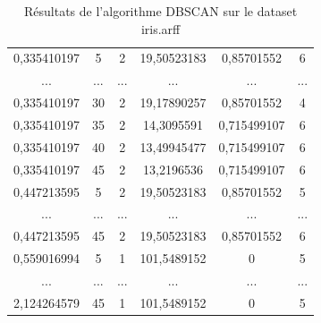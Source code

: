 \begin{table}[H]
\begin{tabular}{|c|c|c|c|c|c|}
				0,335410197         & 5               & 2                   & 19,50523183                      & 0,85701552                       & 6              \\
				...                 & ...             & ...                 & ...                              & ...                              & ...            \\
				0,335410197         & 30              & 2                   & 19,17890257                      & 0,85701552                       & 4              \\
				0,335410197         & 35              & 2                   & 14,3095591                       & 0,715499107                      & 6              \\
				0,335410197         & 40              & 2                   & 13,49945477                      & 0,715499107                      & 6              \\
				0,335410197         & 45              & 2                   & 13,2196536                       & 0,715499107                      & 6              \\
				0,447213595         & 5               & 2                   & 19,50523183                      & 0,85701552                       & 5              \\
				...                 & ...             & ...                 & ...                              & ...                              & ...            \\
				0,447213595         & 45              & 2                   & 19,50523183                      & 0,85701552                       & 6              \\
				0,559016994         & 5               & 1                   & 101,5489152                      & 0                                & 5              \\
				...                 & ...             & ...                 & ...                              & ...                              & ...            \\
				2,124264579         & 45              & 1                   & 101,5489152                      & 0                                & 5              \\ \hline
			\end{tabular}
			\caption{Résultats de l'algorithme DBSCAN sur le dataset iris.arff}
		\end{table}
